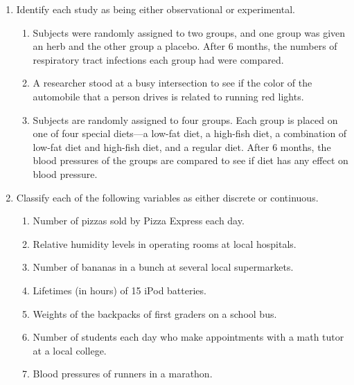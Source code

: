 \documentclass{article}
\begin{document}
\begin{enumerate}
\begin{enumerate}
        \item By 2040 at least 3.5 billion people will run short of water (World Future Society).
        \item Nine out of ten on-the-job fatalities are men (Source: USA TODAY Weekend).
        \item Expenditures for the cable industry were \$5.66 billion in 1996 (Source: USA TODAY).
        \item The median household income for people aged 25–34 is \$35,888 (Source: USA TODAY).
        \item Allergy therapy makes bees go away (Source: Prevention).
        \item Drinking decaffeinated coffee can raise cholesterol levels by 7\% (Source: American Heart Association).
        \item The national average annual medicine expenditure per person is \$1052 (Source: The Greensburg Tribune Review).
        \item Experts say that mortgage rates may soon hit bottom (Source: USA TODAY).
    \end{enumerate}
    \item Identify each study as being either observational or experimental.
    \begin{enumerate}
        \item Subjects were randomly assigned to two groups, and one group was given an herb and the other group a placebo. After 6 months, the numbers of respiratory tract infections each group had were compared.
        \item A researcher stood at a busy intersection to see if the color of the automobile that a person drives is related to running red lights.
        \item Subjects are randomly assigned to four groups. Each group is placed on one of four special diets—a low-fat diet, a high-fish diet, a combination of low-fat diet and high-fish diet, and a regular diet. After 6 months, the blood pressures of the groups are compared to see if diet has any effect on blood pressure.
    \end{enumerate}
    \item Classify each of the following variables as either discrete or continuous.
    \begin{enumerate}
        \item Number of pizzas sold by Pizza Express each day.
        \item Relative humidity levels in operating rooms at local hospitals.
        \item Number of bananas in a bunch at several local supermarkets.
        \item Lifetimes (in hours) of 15 iPod batteries.
        \item Weights of the backpacks of first graders on a school bus.
        \item Number of students each day who make appointments with a math tutor at a local college.
        \item Blood pressures of runners in a marathon.
    \end{enumerate}
\end{enumerate}
\end{document}
